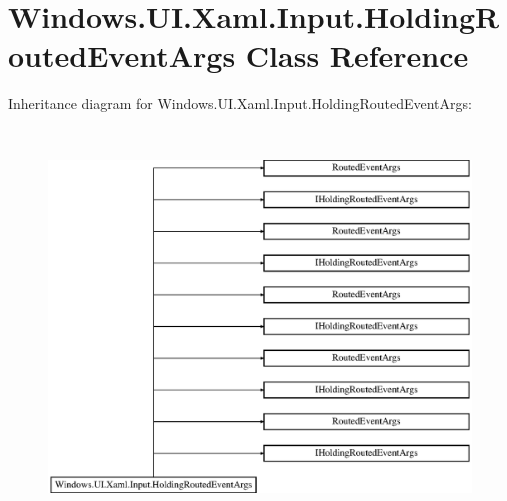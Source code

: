 \hypertarget{class_windows_1_1_u_i_1_1_xaml_1_1_input_1_1_holding_routed_event_args}{}\section{Windows.\+U\+I.\+Xaml.\+Input.\+Holding\+Routed\+Event\+Args Class Reference}
\label{class_windows_1_1_u_i_1_1_xaml_1_1_input_1_1_holding_routed_event_args}
Inheritance diagram for Windows.\+U\+I.\+Xaml.\+Input.\+Holding\+Routed\+Event\+Args\+:\begin{figure}[H]
\begin{center}
\leavevmode
\includegraphics[height=10.511946cm]{class_windows_1_1_u_i_1_1_xaml_1_1_input_1_1_holding_routed_event_args}
\end{center}
\end{figure}
